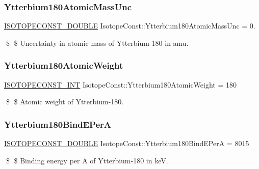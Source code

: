 \subsubsection{\texorpdfstring{Ytterbium180\+Atomic\+Mass\+Unc}{Ytterbium180AtomicMassUnc}}
{\footnotesize\ttfamily \mbox{\hyperlink{group___isotope_const-_macros_ga8f45a7272ce02c0b4c65c44636ed719a}{I\+S\+O\+T\+O\+P\+E\+C\+O\+N\+S\+T\+\_\+\+D\+O\+U\+B\+LE}} Isotope\+Const\+::\+Ytterbium180\+Atomic\+Mass\+Unc = 0.}

\$ \$ Uncertainty in atomic mass of Ytterbium-\/180 in amu. \mbox{\label{group___isotope_const-_ytterbium-_yb180_ga90bf891517d049ce29a5c6e43bfc0b9c}} 
\subsubsection{\texorpdfstring{Ytterbium180\+Atomic\+Weight}{Ytterbium180AtomicWeight}}
{\footnotesize\ttfamily \mbox{\hyperlink{group___isotope_const-_macros_ga5f18360b3e99483a35c32d789e62621c}{I\+S\+O\+T\+O\+P\+E\+C\+O\+N\+S\+T\+\_\+\+I\+NT}} Isotope\+Const\+::\+Ytterbium180\+Atomic\+Weight = 180}

\$ \$ Atomic weight of Ytterbium-\/180. \mbox{\label{group___isotope_const-_ytterbium-_yb180_ga88805bdc49070ba7701f6b27fa469814}} 
\subsubsection{\texorpdfstring{Ytterbium180\+Bind\+E\+PerA}{Ytterbium180BindEPerA}}
{\footnotesize\ttfamily \mbox{\hyperlink{group___isotope_const-_macros_ga8f45a7272ce02c0b4c65c44636ed719a}{I\+S\+O\+T\+O\+P\+E\+C\+O\+N\+S\+T\+\_\+\+D\+O\+U\+B\+LE}} Isotope\+Const\+::\+Ytterbium180\+Bind\+E\+PerA = 8015}

\$ \$ Binding energy per A of Ytterbium-\/180 in keV. \mbox{\label{group___isotope_const-_ytterbium-_yb180_ga741e7f770abb46b2d825f3becd534d86}} 
